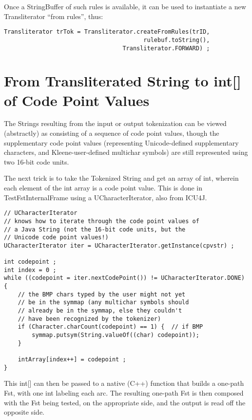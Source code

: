 \documentclass[letterpaper,12pt]{article}
\begin{document}
Once a StringBuffer of such rules is available, it can be used to instantiate a
new Transliterator ``from rules'', thus:

\begin{Verbatim}[fontsize=\footnotesize]
Transliterator trTok = Transliterator.createFromRules(trID, 
                                        rulebuf.toString(), 
                                  Transliterator.FORWARD) ;
\end{Verbatim}

\section{From Transliterated String to int[] of Code Point Values}

The Strings resulting from the input or output tokenization can be viewed
(abstractly) as consisting of a sequence of code point values, though the
supplementary code point values (representing Unicode-defined supplementary
characters, and Kleene-user-defined multichar symbols) are still represented
using two 16-bit code units.

The next trick is to take the Tokenized String and get an array of int, wherein
each element of the int array is a code point value.  This is done in
TestFstInternalFrame using a UCharacterIterator, also from ICU4J.

\begin{Verbatim}[fontsize=\footnotesize]
// UCharacterIterator
// knows how to iterate through the code point values of
// a Java String (not the 16-bit code units, but the 
// Unicode code point values!)
UCharacterIterator iter = UCharacterIterator.getInstance(cpvstr) ;

int codepoint ;
int index = 0 ;
while ((codepoint = iter.nextCodePoint()) != UCharacterIterator.DONE) {
    // the BMP chars typed by the user might not yet
    // be in the symmap (any multichar symbols should
    // already be in the symmap, else they couldn't
    // have been recognized by the tokenizer)
    if (Character.charCount(codepoint) == 1) {  // if BMP
        symmap.putsym(String.valueOf((char) codepoint));
    }

    intArray[index++] = codepoint ;
}
\end{Verbatim}

This int[] can then be passed to a native (C++) function that builds a one-path
Fst, with one int labeling each arc.  The resulting one-path Fst is then composed
with the Fst being tested, on the appropriate side, and the output is read off the opposite side.
\end{document}
